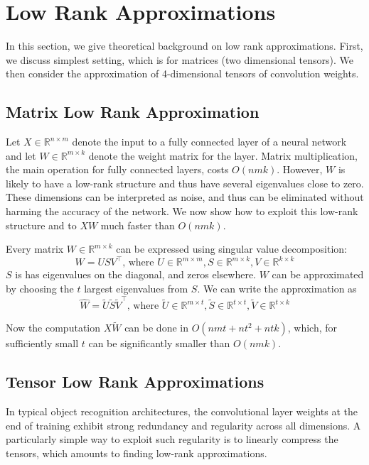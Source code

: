 \section{Low Rank Approximations}
In this section, we give theoretical background on low rank approximations. First, we discuss simplest setting, which is
for matrices (two dimensional tensors). We then consider the approximation of 4-dimensional tensors of convolution weights.


\subsection{Matrix Low Rank Approximation}
Let $X \in \mathbb{R}^{n \times m}$ denote the input to a fully connected layer of a neural network and let $W \in \mathbb{R}^{m \times k}$ denote the weight matrix for the layer. Matrix multiplication,  the main operation for fully connected layers, costs $O(nmk)$. However, $W$ is likely to have a low-rank structure and thus have several eigenvalues close to zero. These dimensions can be interpreted as noise, and thus can be eliminated without harming the accuracy of the network. We now show how to exploit this low-rank structure and to $XW$ much faster than $O(nmk)$. 


Every matrix $W \in \mathbb{R}^{m \times k}$ can be expressed using singular value decomposition:
\begin{equation*}
	W = USV^{\top}\text{, where }U \in \mathbb{R}^{m \times m}, S \in \mathbb{R}^{m \times k}, V \in \mathbb{R}^{k \times k}
\end{equation*}
$S$ is has eigenvalues on the diagonal, and zeros elsewhere. $W$ can be approximated by choosing the $t$ largest 
eigenvalues from $S$. We can write the approximation as
\begin{equation*}
	\hat{W} = \tilde{U}\tilde{S}\tilde{V}^{\top}\text{, where }\tilde{U} \in \mathbb{R}^{m \times t}, \tilde{S} \in \mathbb{R}^{t \times t}, \tilde{V} \in \mathbb{R}^{t \times k}
\end{equation*}

Now the computation $X\tilde{W}$ can be done in $O(nmt + nt^2 + ntk)$, which, for sufficiently small $t$ can be significantly smaller than $O(nmk)$. 

\subsection{Tensor Low Rank Approximations}

In typical object recognition architectures, the convolutional layer weights at the end of training exhibit strong redundancy and regularity across all dimensions. A particularly simple way to exploit such regularity is to 
linearly compress the tensors, which amounts to finding low-rank approximations.

